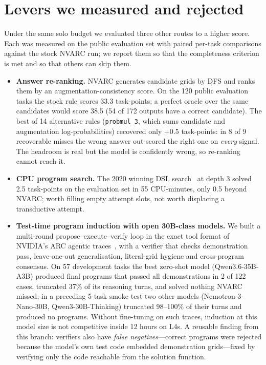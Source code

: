 \documentclass[11pt]{article}
\newcommand{\nvarc}{NVARC}
\begin{document}
\section{Levers we measured and rejected}
\label{sec:negative}
Under the same solo budget we evaluated three other routes to a higher score. Each was measured on the public evaluation set with paired per-task comparisons against the stock \nvarc{} run; we report them so that the completeness criterion is met and so that others can skip them.

\begin{itemize}
\item \textbf{Answer re-ranking.} \nvarc{} generates candidate grids by DFS and ranks them by an augmentation-consistency score. On the 120 public evaluation tasks the stock rule scores 33.3 task-points; a perfect oracle over the same candidates would score 38.5 (54 of 172 outputs have a correct candidate). The best of 14 alternative rules (\texttt{probmul\_3}, which sums candidate and augmentation log-probabilities) recovered only $+0.5$ task-points: in 8 of 9 recoverable misses the wrong answer out-scored the right one on \emph{every} signal. The headroom is real but the model is confidently wrong, so re-ranking cannot reach it.
\item \textbf{CPU program search.} The 2020 winning DSL search~\citep{wind2020icecuber} at depth 3 solved 2.5 task-points on the evaluation set in 55 CPU-minutes, only 0.5 beyond \nvarc{}; worth filling empty attempt slots, not worth displacing a transductive attempt.
\item \textbf{Test-time program induction with open 30B-class models.} We built a multi-round propose--execute--verify loop in the exact tool format of NVIDIA's ARC agentic traces~\citep{nemotronarc2026}, with a verifier that checks demonstration pass, leave-one-out generalisation, literal-grid hygiene and cross-program consensus. On 57 development tasks the best zero-shot model (Qwen3.6-35B-A3B) produced final programs that passed all demonstrations in 2 of 122 cases, truncated 37\% of its reasoning turns, and solved nothing \nvarc{} missed; in a preceding 5-task smoke test two other models (Nemotron-3-Nano-30B, Qwen3-30B-Thinking) truncated 98--100\% of their turns and produced no programs. Without fine-tuning on such traces, induction at this model size is not competitive inside 12 hours on L4s. A reusable finding from this branch: verifiers also have \emph{false negatives}---correct programs were rejected because the model's own test code embedded demonstration grids---fixed by verifying only the code reachable from the solution function.
\end{itemize}
\end{document}
